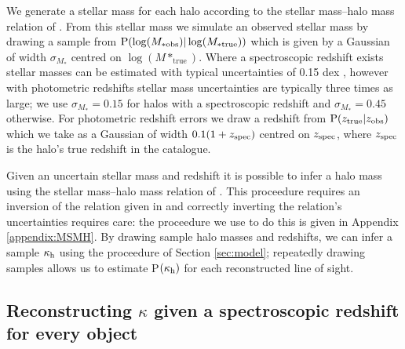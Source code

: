 \documentclass[useAMS,usenatbib]{mn2e}
\begin{document}
We generate a stellar mass for each halo according to the stellar mass--halo mass relation of \citet{BehrooziEtal2009}. From this stellar mass we simulate 
an observed stellar mass by drawing a sample from ${\rm P}(\log(M_{* \mathrm {obs}})|\log(M_{* \mathrm {true}}))$ which is given by a Gaussian of width $\sigma_{M_*}$ centred on $\log(M*_{\mathrm {true}})$. Where a spectroscopic redshift exists stellar masses can be estimated with typical uncertainties of 0.15 dex \citep{AugerEtal2009}, however with photometric redshifts stellar mass uncertainties are typically three times as large; we use $\sigma_{M_*}=0.15$ for halos with a spectroscopic redshift and $\sigma_{M_*}=0.45$ otherwise. For photometric redshift errors we draw a redshift from ${\rm P}(z_{\rm true}|z_{\rm obs})$ which we take as a Gaussian of width $0.1(1+z_{\rm spec})$ centred on $z_{\rm spec}$, where $z_{\rm spec}$ is the halo's true redshift in the \MS catalogue.

Given an uncertain stellar mass and redshift it is possible to infer a halo mass using the stellar mass--halo mass relation of \citet{BehrooziEtal2009}. This proceedure requires an inversion of the relation given in \citet{BehrooziEtal2009} and correctly inverting the relation's uncertainties requires care: the proceedure we use to do this is given in Appendix \ref{appendix:MSMH}. By drawing sample halo masses and redshifts, we can infer a sample $\kappa_{\rm h}$ using the proceedure of Section \ref{sec:model}; repeatedly drawing samples allows us to estimate P$(\kappa_{\rm h})$ for each reconstructed line of sight.

\subsection{Reconstructing $\kappa$ given a spectroscopic redshift for every object}
\end{document}
